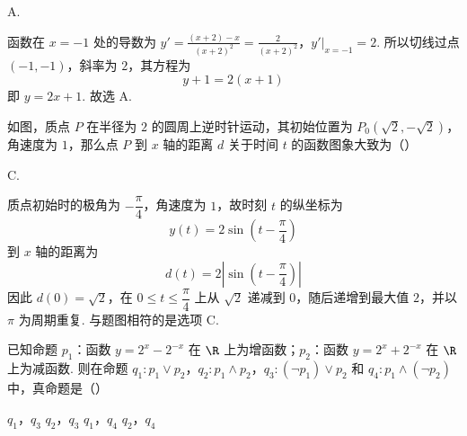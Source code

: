 \begin{answer}
A.
\end{answer}

\begin{solution}
函数在 \(x=-1\) 处的导数为
\(y'=\frac{(x+2)-x}{(x+2)^2}=\frac{2}{(x+2)^2}\)，\(y'\big|_{x=-1}=2\).
所以切线过点 \((-1,-1)\)，斜率为 \(2\)，其方程为
\[
y+1=2(x+1)
\]
即 \(y=2x+1\). 故选 A.
\end{solution}

\begin{problem}
如图，质点 \(P\) 在半径为 \(2\) 的圆周上逆时针运动，其初始位置为 \(P_{0}(\sqrt{2}, - \sqrt{2})\)，角速度为 \(1\)，那么点 \(P\) 到 \(x\) 轴的距离 \(d\) 关于时间 \(t\) 的函数图象大致为（\quad）


    {}
    {}
    {}
\end{problem}

\begin{answer}
C.
\end{answer}

\begin{solution}
质点初始时的极角为 \(-\dfrac{\pi}{4}\)，角速度为 \(1\)，故时刻 \(t\) 的纵坐标为
\[
y(t)=2\sin\left(t-\frac{\pi}{4}\right)
\]
到 \(x\) 轴的距离为
\[
d(t)=2\left|\sin\left(t-\frac{\pi}{4}\right)\right|
\]
因此 \(d(0)=\sqrt{2}\)，在 \(0\leqslant t\leqslant\dfrac{\pi}{4}\) 上从 \(\sqrt{2}\) 递减到 \(0\)，随后递增到最大值 \(2\)，并以 \(\pi\) 为周期重复. 与题图相符的是选项 C.
\end{solution}

\begin{problem}
已知命题 \(p_{1}\)：函数 \( y = 2^{x} - 2^{-x} \) 在 \( \R \) 上为增函数；\(p_{2}\)：函数 \( y = 2^{x} + 2^{-x} \) 在 \( \R \) 上为减函数. 则在命题 \(q_{1}: p_{1} \vee p_{2}\)，\(q_{2}: p_{1} \wedge p_{2}\)，\(q_{3}: (\neg p_{1}) \vee p_{2}\) 和 \(q_{4}: p_{1} \wedge (\neg p_{2})\) 中，真命题是（\quad）

\choices
    {\(q_{1}\)，\(q_{3}\)}
    {\(q_{2}\)，\(q_{3}\)}
    {\(q_{1}\)，\(q_{4}\)}
    {\(q_{2}\)，\(q_{4}\)}
\end{problem}

